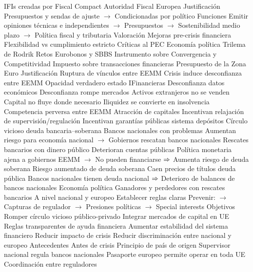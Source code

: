 \documentclass{nuevotema}
\begin{document}
\begin{esquemal}
				\4 IFIs creadas por Fiscal Compact
				\4 Autoridad Fiscal Europea
				\4 Justificación
				\4[] Presupuestos y sendas de ajuste
				\4[] $\to$ Condicionadas por político
				\4 Funciones
				\4[] Emitir opiniones técnicas e independientes
				\4[] $\to$ Presupuestos
				\4[] $\to$ Sostenibilidad medio plazo
				\4[] $\to$ Política fiscal y tributaria
		\2 Valoración
			\3 Mejoras pre-crisis financiera
			\3 Flexibilidad vs cumplimiento estricto
			\3 Críticas al PEC
			\3 Economía política
			\3 Trilema de Rodrik
		\2 Retos
			\3 Eurobonos y SBBS
			\3 Instrumento sobre Convergencia y Competitividad
			\3 Impuesto sobre transacciones financieras
			\3 Presupuesto de la Zona Euro
	\1 
		\2 Justificación
			\3 Ruptura de vínculos entre EEMM
				\4 Crisis induce desconfianza entre EEMM
				\4[] Opacidad verdadero estado IFinancieras
				\4[] Desconfianza datos económicos
				\4 Desconfianza rompe mercados
				\4[] Activos extranjeros no se venden
				\4[] Capital no fluye donde necesario
				\4[] Iliquidez se convierte en insolvencia
			\3 Competencia perversa entre EEMM
				\4 Atracción de capitales
				\4[] Incentivan relajación de supervisión/regulación
				\4[] Incentivan garantías públicas sistema depósitos
			\3 Círculo vicioso deuda bancaria--soberana
				\4 Bancos nacionales con problemas
				\4[] Aumentan riesgo para economía nacional
				\4[] $\to$ Gobiernos rescatan bancos nacionales
				\4 Rescates bancarios con dinero público
				\4[] Deterioran cuentas públicas
				\4[] Política monetaria ajena a gobiernos EEMM
				\4[] $\to$ No pueden financiarse
				\4[] $\Rightarrow$ Aumenta riesgo de deuda soberana
				\4 Riesgo aumentado de deuda soberana
				\4[] Caen precios de títulos deuda pública
				\4[] Bancos nacionales tienen deuda nacional
				\4[] $\Rightarrow$ Deterioro de balances de bancos nacionales
			\3 Economía política
				\4 Ganadores y perdedores con rescates bancarios
				\4[] A nivel nacional y europeo
				\4 Establecer reglas claras
				\4[] Prevenir:
				\4[] $\to$ Capturas de regulador
				\4[] $\to$ Presiones políticas
				\4[] $\to$ Special interests
		\2 Objetivos
			\3 Romper círculo vicioso público-privado
			\3 Integrar mercados de capital en UE
			\3 Reglas transparentes de ayuda financiera
			\3 Aumentar estabilidad del sistema financiero
			\3 Reducir impacto de crisis
			\3 Reducir discriminación entre nacional y europeo
		\2 Antecedentes
			\3 Antes de crisis
				\4 Principio de país de origen
				\4[] Supervisor nacional regula bancos nacionales
				\4[] Pasaporte europeo permite operar en toda UE
				\4 Coordinación entre reguladores

\end{esquemal}
\end{document}
